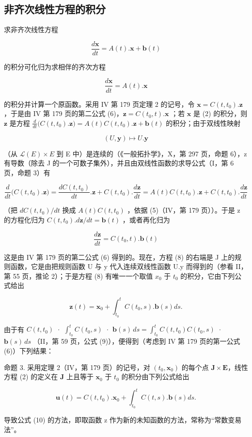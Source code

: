 \subsection{非齐次线性方程的积分}

求非齐次线性方程

\[
{\frac {d \mathbf {x}}{d t}} = A (t). \mathbf {x} + \mathbf {b} (t)\tag{2}
\]

的积分可化归为求相伴的齐次方程

\[
{\frac {d \mathbf {x}}{d t}} = A (t). \mathbf {x}\tag{4}
\]

的积分并计算一个原函数。采用 IV 第 179 页定理 2 的记号，令 \(\mathbf{x} = C(t, t_0).\mathbf{z}\) ，于是由 IV 第 179 页的第二公式 (6)，\(\mathbf{z} = C(t_0, t).\mathbf{x}\) ；若 \(\mathbf{x}\) 是 (2) 的积分，则 \(\mathbf{z}\) 是方程 \(\frac{d}{dt}\big(C(t, t_0).\mathbf{z}\big) = A(t)C(t, t_0).\mathbf{z} + \mathbf{b}(t)\) 的积分；由于双线性映射

\[
(U, \mathbf {y}) \mapsto U. \mathbf {y}
\]

（从 \(\mathcal{L}(E) \times E\) 到 E 中）是连续的（《一般拓扑学》，X，第 297 页，命题 6），z 有导数（除去 J 的一个可数子集外），并且由双线性函数的求导公式（I，第 6 页，命题 3）有

\[
\frac {d}{d t} \big (C (t, t _ {0}). \mathbf {z} \big) = \frac {d C (t , t _ {0})}{d t}. \mathbf {z} + C (t, t _ {0}). \frac {d \mathbf {z}}{d t} = A (t) C (t, t _ {0}). \mathbf {z} + C (t, t _ {0}). \frac {d \mathbf {z}}{d t}
\]

（把 \(dC(t, t_{0})/dt\) 换成 \(A(t)C(t, t_{0})\) ，依据 (5)（IV，第 179 页））。于是 z 的方程化归为 \(C(t, t_{0}).d\mathbf{z}/dt = \mathbf{b}(t)\) ，或者再化归为

\[
\frac {d \mathbf {z}}{d t} = C (t _ {0}, t). \mathbf {b} (t)\tag{8}
\]

这是由 IV 第 179 页的第二公式 (6) 得到的。现在，方程 (8) 的右端是 J 上的规则函数，它是由把规则函数 U 与 y 代入连续双线性函数 U.y 而得到的（参看 II，第 55 页，推论 2）；于是方程 (8) 有唯一一个取值 \(x_{0}\) 于 \(t_{0}\) 的积分，它由下列公式给出

\[
\mathbf {z} (t) = \mathbf {x} _ {0} + \int_ {t _ {0}} ^ {t} C (t _ {0}, s). \mathbf {b} (s) d s.\tag{9}
\]

由于有 \(C(t, t_{0})\) · \(\int_{t_{0}}^{t} C(t_{0}, s)\) · \(\mathbf{b}(s) \, ds = \int_{t_{0}}^{t} C(t, t_{0}) C(t_{0}, s)\) · \(\mathbf{b}(s) \, ds\) （II，第 59 页，公式 (9)），便得到（考虑到 IV 第 179 页的第一公式 (6)）下列结果：

命题 3. 采用定理 2（IV，第 179 页）的记号，对 \((t_0, \mathbf{x}_0)\) 的每个点 \(\mathbf{J} \times \mathbf{E}\)，线性方程 (2) 的定义在 \(\mathbf{J}\) 上且等于 \(\mathbf{x}_0\) 于 \(t_0\) 的积分由下列公式给出

\[
\mathbf {u} (t) = C (t, t _ {0}). \mathbf {x} _ {0} + \int_ {t _ {0}} ^ {t} C (t, s). \mathbf {b} (s) d s.\tag{10}
\]

导致公式 (10) 的方法，即取函数 z 作为新的未知函数的方法，常称为“常数变易法”。
\relax{}
